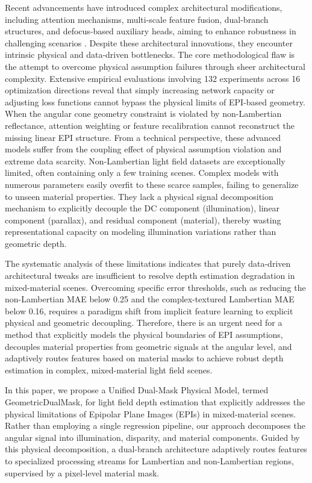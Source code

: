Recent advancements have introduced complex architectural modifications, including attention mechanisms, multi-scale feature fusion, dual-branch structures, and defocus-based auxiliary heads, aiming to enhance robustness in challenging scenarios . Despite these architectural innovations, they encounter intrinsic physical and data-driven bottlenecks. The core methodological flaw is the attempt to overcome physical assumption failures through sheer architectural complexity. Extensive empirical evaluations involving 132 experiments across 16 optimization directions reveal that simply increasing network capacity or adjusting loss functions cannot bypass the physical limits of EPI-based geometry. When the angular cone geometry constraint is violated by non-Lambertian reflectance, attention weighting or feature recalibration cannot reconstruct the missing linear EPI structure. From a technical perspective, these advanced models suffer from the coupling effect of physical assumption violation and extreme data scarcity. Non-Lambertian light field datasets are exceptionally limited, often containing only a few training scenes. Complex models with numerous parameters easily overfit to these scarce samples, failing to generalize to unseen material properties. They lack a physical signal decomposition mechanism to explicitly decouple the DC component (illumination), linear component (parallax), and residual component (material), thereby wasting representational capacity on modeling illumination variations rather than geometric depth.

The systematic analysis of these limitations indicates that purely data-driven architectural tweaks are insufficient to resolve depth estimation degradation in mixed-material scenes. Overcoming specific error thresholds, such as reducing the non-Lambertian MAE below 0.25 and the complex-textured Lambertian MAE below 0.16, requires a paradigm shift from implicit feature learning to explicit physical and geometric decoupling. Therefore, there is an urgent need for a method that explicitly models the physical boundaries of EPI assumptions, decouples material properties from geometric signals at the angular level, and adaptively routes features based on material masks to achieve robust depth estimation in complex, mixed-material light field scenes.

In this paper, we propose a Unified Dual-Mask Physical Model, termed GeometricDualMask, for light field depth estimation that explicitly addresses the physical limitations of Epipolar Plane Images (EPIs) in mixed-material scenes. Rather than employing a single regression pipeline, our approach decomposes the angular signal into illumination, disparity, and material components. Guided by this physical decomposition, a dual-branch architecture adaptively routes features to specialized processing streams for Lambertian and non-Lambertian regions, supervised by a pixel-level material mask.

